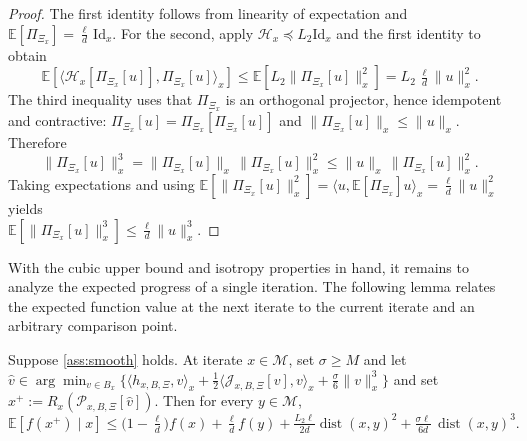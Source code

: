 \documentclass[final,onefignum,onetabnum]{siamart250211}
\begin{document}
  \begin{proof}
  The first identity follows from linearity of expectation and $\mathbb{E}[\Pi_{\Xi_x}]=\tfrac{\ell}{d}\,\mathrm{Id}_x$. For the second, apply $\mathcal{H}_x \preceq L_2 \mathrm{Id}_x$ and the first identity to obtain
  \[
  \mathbb{E}\left[\langle \mathcal{H}_x[\Pi_{\Xi_x}[u]],\Pi_{\Xi_x}[u]\rangle_x\right]\le \mathbb{E}\left[L_2\|\Pi_{\Xi_x}[u]\|_x^{2}\right]=L_2\,\tfrac{\ell}{d}\|u\|_x^{2}.
  \]
  The third inequality uses that $\Pi_{\Xi_x}$ is an orthogonal projector, hence idempotent and contractive: $\Pi_{\Xi_x}[u]=\Pi_{\Xi_x}[\Pi_{\Xi_x}[u]]$ and $\|\Pi_{\Xi_x}[u]\|_x\le \|u\|_x$. Therefore
  \[
  \|\Pi_{\Xi_x}[u]\|_x^{3}=\|\Pi_{\Xi_x}[u]\|_x\,\|\Pi_{\Xi_x}[u]\|_x^{2}\le \|u\|_x\,\|\Pi_{\Xi_x}[u]\|_x^{2}.
  \]
  Taking expectations and using $\mathbb{E}[\|\Pi_{\Xi_x}[u]\|_x^{2}]=\langle u,\mathbb{E}[\Pi_{\Xi_x}]u\rangle_x=\tfrac{\ell}{d}\|u\|_x^{2}$ yields\\
  $
  \mathbb{E}[\|\Pi_{\Xi_x}[u]\|_x^{3}]\le \tfrac{\ell}{d}\|u\|_x^{3}.
  $
  \end{proof}


  With the cubic upper bound and isotropy properties in hand, it remains to analyze the expected progress of a single iteration. The following lemma relates the expected function value at the next iterate to the current iterate and an arbitrary comparison point.
  
  \begin{lemma}\label{lem:one-step-progress}
  Suppose \cref{ass:smooth} holds. At iterate $x\in\mathcal{M}$, set $\sigma \geq M$ and let $\hat{v} \in\arg\min_{v\in B_x}\big\{\langle h_{x, B, \Xi},v\rangle_x+\tfrac{1}{2}\langle \mathcal{J}_{x, B, \Xi} [v],v\rangle_x+\tfrac{\sigma}{6}\|v\|_x^{3}\big\}$ and set $x^{+}:=R_x(\mathcal{P}_{x, B, \Xi} [\hat{v}])$. Then for every $y\in\mathcal{M}$,
  \[
  \mathbb{E}\left[f(x^{+})\mid x\right]\le\Big(1-\tfrac{\ell}{d}\Big)f(x)+\tfrac{\ell}{d}f(y)+\tfrac{L_2\ell}{2d}\operatorname{dist}(x,y)^{2}+\tfrac{\sigma\ell}{6d}\,\operatorname{dist}(x,y)^{3}.
  \]
  \end{lemma}
\end{document}
